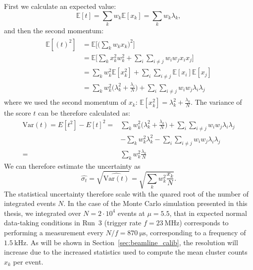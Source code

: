 First we calculate an expected value:
\begin{equation}
        \mathbb{E}[t]=\sum_k w_k \mathbb{E}[x_k]=\sum_k w_k \lambda_k,
\end{equation}
and then the second momentum:
\begin{align}
\begin{split}
    \mathbb{E}[(t)^2]&= \mathbb{E}\biggl[\biggl(\sum_k w_k x_k\biggr)^2\biggr] \\
    &=\mathbb{E}\biggl[\sum_k x_k^2w_k^2 +\sum_i\sum_{i\neq j} w_i w_j x_i x_j\biggr]\\
    &= \sum_k w_k^2\mathbb{E}[x_k^2] + \sum_i\sum_{i\neq j} \mathbb{E}[x_i] \mathbb{E}[x_j]\\
     &= \sum_k w_k^2 \bigl(\lambda_k^2 +\frac{\lambda_i}{N}\bigr) + \sum_i\sum_{i\neq j}w_i w_j \lambda_i \lambda_j
\end{split}
\end{align}
where we used the second momentum of $x_k$: $\mathbb{E}[x_k^2]=\lambda_k^2+\tfrac{\lambda_k}{N}$. 
The variance of the score $t$ can be therefore calculated as:
\begin{equation}
\begin{split}
    \text{Var}(t)= E[t^2]-E[t]^2=& \sum_k w_k^2 \bigl(\lambda_k^2 +\frac{\lambda_k}{N}\bigr) + \sum_i\sum_{i\neq j}w_i w_j \lambda_i \lambda_j\\
    &- \sum_k w_k^2\lambda_k^2 - \sum_i\sum_{i\neq j}w_i w_j \lambda_i \lambda_j\\
    =&\sum_k w_k^2\frac{\lambda_k}{N}
    \end{split}
\end{equation}
We can therefore estimate the uncertainty as 
\begin{equation}
    \hat{\sigma_t}=\sqrt{\widehat{\text{Var}(t)}}=\sqrt{\sum_k w_k^2\frac{x_k}{N}}.
\end{equation}
The statistical uncertainty therefore scale with the quared root of the number of integrated events $N$. In the case of the Monte Carlo simulation presented in this thesis, we integrated over ${N=2\cdot10^{4}}$ events at $\mu=5.5$, that in expected normal data-taking conditions in Run~3 (trigger rate $f=\SI{23}{\mega\hertz}$) corresponds to performing a measurement every $N/f=\SI{870}{\micro\second}$, corresponding to a frequency of $\SI{1.5}{\kilo\hertz}$. As will be shown in Section~\ref{sec:beamline_calib}, the resolution will increase due to the increased statistics used to compute the mean cluster counts $x_k$ per event.

